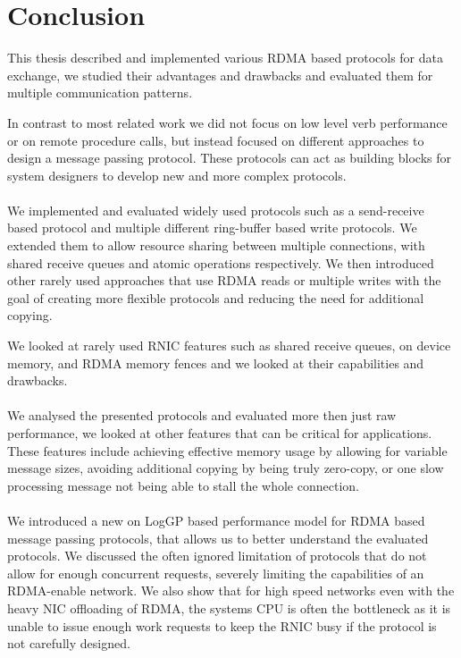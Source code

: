 \section{Conclusion}

This thesis described and implemented various RDMA based protocols for data exchange, we studied their advantages and 
drawbacks and evaluated them for multiple communication patterns.

In contrast to most related work we did not focus on low level verb performance or on remote procedure calls, but instead 
focused on different approaches to design a message passing protocol. These protocols can act as building blocks for 
system designers to develop new and more complex protocols.

\paragraph{} We implemented and evaluated widely used protocols such as a send-receive based protocol and multiple different
ring-buffer based write protocols. We extended them to allow resource sharing between multiple connections, with shared 
receive queues and atomic operations respectively. We then introduced other rarely used approaches that use RDMA reads or 
multiple writes with the goal of creating more flexible protocols and reducing the need for additional copying.

We looked at rarely used RNIC features such as shared receive queues, on device memory, and RDMA memory fences and we looked
at their capabilities and drawbacks.


\paragraph{} We analysed the presented protocols and evaluated more then just raw performance, we looked at other
features that can be critical for applications.  These features include achieving effective memory usage by allowing 
for variable message sizes, avoiding additional copying by being truly zero-copy, or one slow processing message not
being able to stall the whole connection.

\paragraph{} We introduced a new on LogGP based performance model for RDMA based message passing protocols, that allows us to 
better understand the evaluated protocols. We discussed the often ignored limitation of protocols that do not allow for enough
concurrent requests, severely limiting the capabilities of an RDMA-enable network. We also show that for high speed networks
even with the heavy NIC offloading of RDMA, the systems CPU is often the bottleneck as it is unable to issue enough work requests to
keep the RNIC busy if the protocol is not carefully designed.


